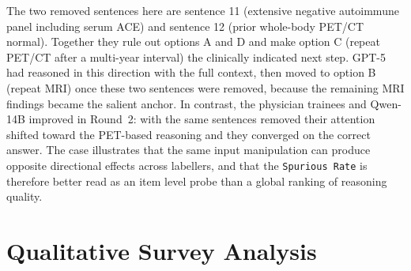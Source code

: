 \documentclass[11pt]{article}
\providecommand{\ourmetric}{\texttt{Spurious Rate}\xspace}
\begin{document}
\noindent The two removed sentences here are sentence 11 (extensive negative autoimmune panel including serum ACE) and sentence 12 (prior whole-body PET/CT normal). Together they rule out options A and D and make option C (repeat PET/CT after a multi-year interval) the clinically indicated next step. GPT-5 had reasoned in this direction with the full context, then moved to option B (repeat MRI) once these two sentences were removed, because the remaining MRI findings became the salient anchor. In contrast, the physician trainees and Qwen-14B improved in Round~2: with the same sentences removed their attention shifted toward the PET-based reasoning and they converged on the correct answer. The case illustrates that the same input manipulation can produce opposite directional effects across labellers, and that the \ourmetric is therefore better read as an item level probe than a global ranking of reasoning quality.


\section{Qualitative Survey Analysis}
\end{document}
